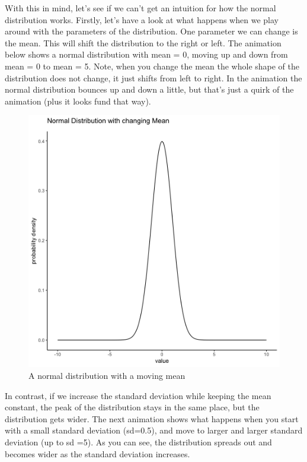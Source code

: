 \documentclass[]{book}
\begin{document}
With this in mind, let's see if we can't get an intuition for how the normal distribution works. Firstly, let's have a look at what happens when we play around with the parameters of the distribution. One parameter we can change is the mean. This will shift the distribution to the right or left. The animation below shows a normal distribution with mean = 0, moving up and down from mean = 0 to mean = 5. Note, when you change the mean the whole shape of the distribution does not change, it just shifts from left to right. In the animation the normal distribution bounces up and down a little, but that's just a quirk of the animation (plus it looks fund that way).

\begin{figure}
\centering
\includegraphics{gifs/normalMovingMean-1.gif}
\caption{\label{fig:4normalMeanShift}A normal distribution with a moving mean}
\end{figure}

In contrast, if we increase the standard deviation while keeping the mean constant, the peak of the distribution stays in the same place, but the distribution gets wider. The next animation shows what happens when you start with a small standard deviation (sd=0.5), and move to larger and larger standard deviation (up to sd =5). As you can see, the distribution spreads out and becomes wider as the standard deviation increases.
\end{document}
